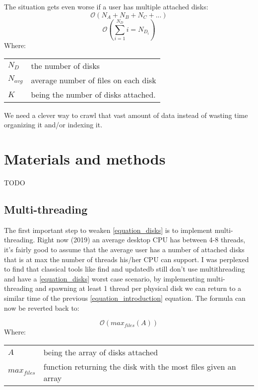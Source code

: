 \documentclass[12pt]{article}
\makeatletter
\newenvironment{conditions}
  {\par\vspace{\abovedisplayskip}\noindent\begin{tabular}{>{$}l<{$} @{${}={}$} l}}
  {\end{tabular}\par\vspace{\belowdisplayskip}}
\newcommand{\bigO}{\mathcal{O}}
\makeatother
\begin{document}
\begin{samepage}
The situation gets even worse if a user has multiple attached disks: 
\begin{equation}
    \label{equation_disks}
    \bigO(N_A+N_B+N_C+...)
\end{equation}
\begin{equation}
    \label{equation_disks}
    \bigO(\sum_{i=1}^{N_D}i=N_{D_i})
\end{equation}
Where:
\begin{conditions}
    N_D & the number of disks \\
    N_{avg} & average number of files on each disk\\
    K & being the number of disks attached.
\end{conditions}
\end{samepage}

We need a clever way to crawl that vast amount of data instead of wasting time organizing it and/or indexing it.

\section{Materials and methods}

TODO

\subsection{Multi-threading}
The first important step to weaken \ref{equation_disks} is to implement multi-threading.
Right now (2019) an average desktop CPU has between 4-8 threads, it's fairly good to assume that the average user has a number of attached disks that is at max the number of threads his/her CPU can support.
I was perplexed to find that classical tools like find and updatedb still don't use multithreading and have a \ref{equation_disks} worst case scenario, by implementing multi-threading and spawning at least 1 thread per physical disk we can return to a similar time of the previous \ref{equation_introduction} equation.
The formula can now be reverted back to:

\begin{equation}
    \label{equation_multithreading}
    \bigO(max_{files}(A))
\end{equation}
Where:
\begin{conditions}
    A & being the array of disks attached \\
    max_{files} & function returning the disk with the most files given an array
\end{conditions}
\end{document}
